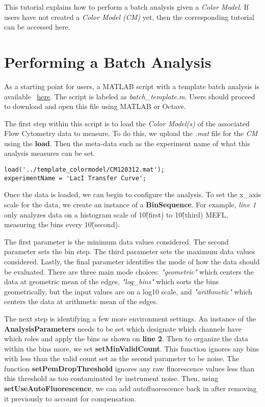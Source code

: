 This tutorial explains how to perform a batch analysis given a \textit{Color Model}. If users have not created a \textit{Color Model (CM)} yet, then the corresponding tutorial can be accessed here. 

\section*{Performing a Batch Analysis}

As a starting point for users, a MATLAB script with a template batch analysis is available ~\href{https://github.com/mehersam/TASBEFlowAnalytics/blob/gh-pages/docs/BatchAnalysisTutorial/batch_template.m}{here}. The script is labeled as \textit{batch\_template.m}. Users should proceed to download and open this file using MATLAB or Octave.

The first step within this script is to load the \textit{Color Model(s)} of the associated Flow Cytometry data to measure. To do this, we upload the \textit{.mat} file for the \textit{CM} using the \textbf{load}. Then the meta-data such as the experiment name of what this analysis measures can be set. 

\begin{minipage}{0.95\textwidth} 
\begin{lstlisting}
load('../template_colormodel/CM120312.mat');
experimentName = 'LacI Transfer Curve';
\end{lstlisting}
\end{minipage}

Once the data is loaded, we can begin to configure the analysis. To set the x\_axis scale for the data, we create an instance of a \textbf{BinSequence}. For example, \textit{line 1} only analyzes data on a histogram scale of 10\^(first) to 10\^(third) MEFL, measuring the bins every 10\^(second). 

The first parameter is the minimum data values considered. The second parameter sets the bin step. The third parameter sets the maximum data values considered. Lastly, the final parameter identifies the mode of how the data should be evaluated. There are three main mode choices: \textit{"geometric"} which centers the data at geometric mean of the edges, \textit{"log\_bins"} which sorts the bins geometrically, but the input values are on a log10 scale, and \textit{"arithmetic"} which centers the data at arithmetic mean of the edges.  

The next step is identifying a few more environment settings. An instance of the \textbf{AnalysisParameters} needs
to be set which designate which channels have which roles and apply the bins as shown on \textbf{line 2}. Then to organize the data within the bins more, we set \textbf{setMinValidCount}. This function ignores any bins with less than the valid count set as the second parameter to be noise. The function \textbf{setPemDropThreshold} ignores any raw fluorescence values less than this threshold as too contaminated by instrument noise. Then, using \textbf{setUseAutoFluorescence}, we can add autofluorescence back in after removing it previously to account for compensation.

